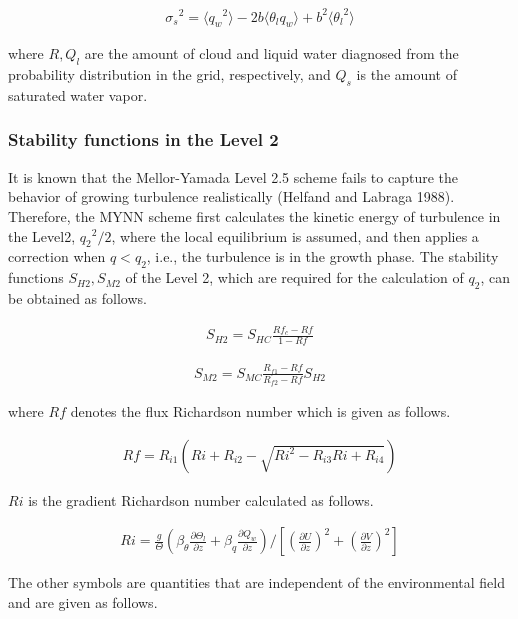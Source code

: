 \begin{eqnarray}{\sigma_s}^2=\langle {q_w}^2 \rangle -2b \langle \theta_l q_w \rangle + b^2\langle {\theta_l}^2 \rangle\end{eqnarray}

where \(R,Q_l\) are the amount of cloud and liquid water diagnosed from
the probability distribution in the grid, respectively, and \(Q_s\) is
the amount of saturated water vapor.

\hypertarget{stability-functions-in-the-level-2}{%
\subsubsection{Stability functions in the Level
2}\label{stability-functions-in-the-level-2}}

It is known that the Mellor-Yamada Level 2.5 scheme fails to capture the
behavior of growing turbulence realistically (Helfand and Labraga 1988).
Therefore, the MYNN scheme first calculates the kinetic energy of
turbulence in the Level2, \({q_2}^2/2\), where the local equilibrium is
assumed, and then applies a correction when \(q<q_2\), i.e., the
turbulence is in the growth phase. The stability functions
\(S_{H2},S_{M2}\) of the Level 2, which are required for the calculation
of \(q_2\), can be obtained as follows.

\begin{eqnarray}S_{H2}=S_{HC}\frac{Rf_c-Rf}{1-Rf}\end{eqnarray}

\begin{eqnarray}S_{M2}=S_{MC}\frac{R_{f1}-Rf}{R_{f2}-Rf}S_{H2}\end{eqnarray}

where \(Rf\) denotes the flux Richardson number which is given as
follows.

\begin{eqnarray}Rf=R_{i1}\left(Ri+R_{i2}-\sqrt{Ri^2-R_{i3}Ri+R_{i4}}\right)\end{eqnarray}

\(Ri\) is the gradient Richardson number calculated as follows.

\begin{eqnarray}Ri=\frac{g}{\Theta}\left(\beta_\theta \frac{\partial \Theta_l}{\partial z}+\beta_q \frac{\partial Q_w}{\partial z}\right) \Bigg/ \left[ \left(\frac{\partial U}{\partial z}\right)^2+\left(\frac{\partial V}{\partial z}\right)^2 \right]\end{eqnarray}

The other symbols are quantities that are independent of the
environmental field and are given as follows.

